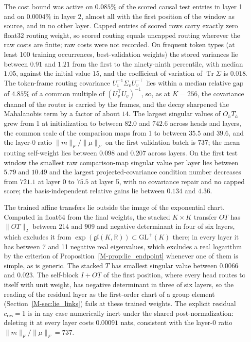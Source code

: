 \documentclass[twoside,11pt]{article}
\begin{document}
The cost bound was active on $0.085\%$ of the scored causal test entries in layer 1 and on $0.0004\%$ in layer 2, almost all with the first position of the window as source, and in no other layer. Capped entries of scored rows carry exactly zero float32 routing weight, so scored routing equals uncapped routing wherever the raw costs are finite; raw costs were not recorded. On frequent token types (at least 100 training occurrences, best-validation weights) the stored variances lie between $0.91$ and $1.21$ from the first to the ninety-ninth percentile, with median $1.05$, against the initial value $15$, and the coefficient of variation of $\operatorname{Tr}\Sigma$ is $0.018$. The token-frame routing covariance $U_v^{-1}\Sigma_vU_v^{-\top}$ lies within a median relative gap of $4.85\%$ of a common multiple of $(U_v^\top U_v)^{-1}$, so, as at $K=256$, the covariance channel of the router is carried by the frames, and the decay sharpened the Mahalanobis term by a factor of about $14$. The largest singular values of $O_hT_h$ grew from 1 at initialization to between $82.0$ and $742.6$ across heads and layers, the common scale of the comparison maps from 1 to between $35.5$ and $39.6$, and the layer-0 ratio $\|m\|_F/\|\mu\|_F$ on the first validation batch is $737$; the mean routing self-weight lies between $0.098$ and $0.207$ across layers. On the first test window the smallest raw comparison-map singular value per layer lies between $5.79$ and $10.49$ and the largest projected-covariance condition number decreases from $721.1$ at layer 0 to $75.5$ at layer 5, with no covariance repair and no capped score; the basis-independent relative gains lie between $0.134$ and $4.36$.

The trained affine transfers lie outside the image of the exponential chart. Computed in float64 from the final weights, the stacked $K\times K$ transfer $OT$ has $\|OT\|_2$ between $214$ and $909$ and negative determinant in four of six layers, which excludes it from $\exp(\mathfrak{gl}(K,\mathbb R))\subset\mathrm{GL}^+(K)$ there; in every layer it has between 7 and 11 negative real eigenvalues, which excludes a real logarithm by the criterion of Proposition~\ref{M-prop:lie_endpoint} whenever one of them is simple, as is generic. The stacked $T$ has smallest singular value between $0.0066$ and $0.023$. The self-block $I+OT$ of the first position, where every head routes to itself with unit weight, has negative determinant in three of six layers, so the reading of the residual layer as the first-order chart of a group element (Section~\ref{M-sec:lie_links}) fails at these trained weights. The explicit residual $c_{\mathrm{res}}=1$ is in any case numerically inert under the shared post-normalization: deleting it at every layer costs $0.00091$ nats, consistent with the layer-0 ratio $\|m\|_F/\|\mu\|_F=737$.
\end{document}
